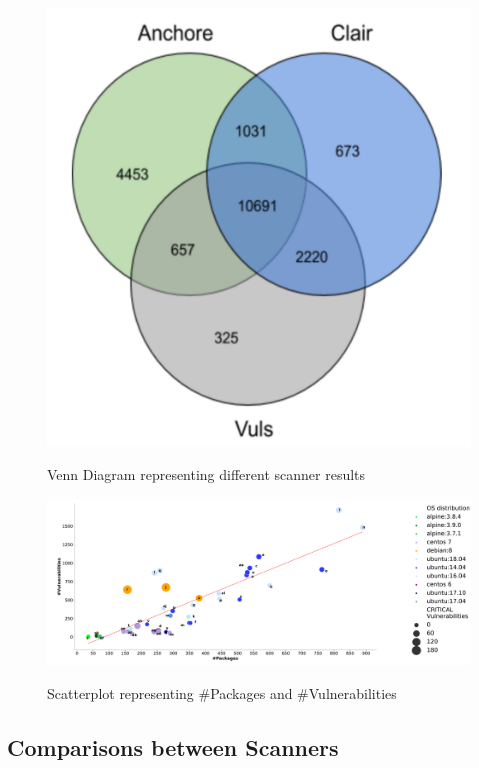 \documentclass[a4paper,num-refs]{oup-contemporary}
\begin{document}
\begin{figure}[H]
        {\includegraphics[scale=2.5,width=\columnwidth]
        {Figures/vennDiagram.pdf}}
        \caption{\label{fig:venn} Venn Diagram representing different scanner results}
\end{figure}

\begin{figure}
	{\includegraphics[scale=1.5,width=\textwidth]
	{Figures/vulngraph.pdf}}
        \caption{\label{fig:graph1} Scatterplot representing \#Packages and \#Vulnerabilities}
      \end{figure}

\subsection{Comparisons between Scanners}
\end{document}
